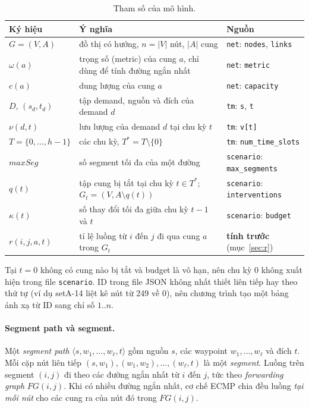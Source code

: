 \documentclass[11pt,a4paper]{article}
\begin{document}
\begin{table}[h]
\centering\small
\begin{tabular}{@{}lp{7.6cm}l@{}}
\toprule
Ký hiệu & Ý nghĩa & Nguồn \\
\midrule
$G=(V,A)$ & đồ thị có hướng, $n=|V|$ nút, $|A|$ cung & \texttt{net}: \texttt{nodes}, \texttt{links} \\
$\omega(a)$ & trọng số (metric) của cung $a$, chỉ dùng để tính đường ngắn nhất & \texttt{net}: \texttt{metric} \\
$c(a)$ & dung lượng của cung $a$ & \texttt{net}: \texttt{capacity} \\
$D$, $(s_d,t_d)$ & tập demand, nguồn và đích của demand $d$ & \texttt{tm}: \texttt{s}, \texttt{t} \\
$\nu(d,t)$ & lưu lượng của demand $d$ tại chu kỳ $t$ & \texttt{tm}: \texttt{v[t]} \\
$T=\{0,\dots,h-1\}$ & các chu kỳ, $T^*=T\setminus\{0\}$ & \texttt{tm}: \texttt{num\_time\_slots} \\
$maxSeg$ & số segment tối đa của một đường & \texttt{scenario}: \texttt{max\_segments} \\
$q(t)$ & tập cung bị tắt tại chu kỳ $t\in T^*$; $G_t=(V,A\setminus q(t))$ & \texttt{scenario}: \texttt{interventions} \\
$\kappa(t)$ & số thay đổi tối đa giữa chu kỳ $t-1$ và $t$ & \texttt{scenario}: \texttt{budget} \\
$r(i,j,a,t)$ & tỉ lệ luồng từ $i$ đến $j$ đi qua cung $a$ trong $G_t$ & \textbf{tính trước} (mục~\ref{sec:r}) \\
\bottomrule
\end{tabular}
\caption{Tham số của mô hình.}\label{tab:data}
\end{table}

Tại $t=0$ không có cung nào bị tắt và budget là vô hạn, nên chu kỳ $0$ không xuất hiện trong file \texttt{scenario}.
ID trong file JSON không nhất thiết liên tiếp hay theo thứ tự (ví dụ setA-14 liệt kê nút từ 249 về 0), nên chương trình tạo một bảng ánh xạ từ ID sang chỉ số $1..n$.

\paragraph{Segment path và segment.}
Một \emph{segment path} $\langle s,w_1,\dots,w_\ell,t\rangle$ gồm nguồn $s$, các waypoint $w_1,\dots,w_\ell$ và đích $t$.
Mỗi cặp nút liên tiếp $(s,w_1),(w_1,w_2),\dots,(w_\ell,t)$ là một \emph{segment}.
Luồng trên segment $(i,j)$ đi theo các đường ngắn nhất từ $i$ đến $j$, tức theo \emph{forwarding graph} $FG(i,j)$.
Khi có nhiều đường ngắn nhất, cơ chế ECMP chia đều luồng \emph{tại mỗi nút} cho các cung ra của nút đó trong $FG(i,j)$.
\end{document}

